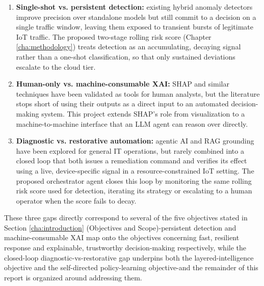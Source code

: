 \begin{enumerate}
	\item \textbf{Single-shot vs. persistent detection:} existing hybrid anomaly detectors improve precision over standalone models but still commit to a decision on a single traffic window, leaving them exposed to transient bursts of legitimate IoT traffic. The proposed two-stage rolling risk score (Chapter \ref{cha:methodology}) treats detection as an accumulating, decaying signal rather than a one-shot classification, so that only sustained deviations escalate to the cloud tier.
	\item \textbf{Human-only vs. machine-consumable XAI:} SHAP and similar techniques have been validated as tools for human analysts, but the literature stops short of using their outputs as a direct input to an automated decision-making system. This project extends SHAP's role from visualization to a machine-to-machine interface that an LLM agent can reason over directly.
	\item \textbf{Diagnostic vs. restorative automation:} agentic AI and RAG grounding have been explored for general IT operations, but rarely combined into a closed loop that both issues a remediation command and verifies its effect using a live, device-specific signal in a resource-constrained IoT setting. The proposed orchestrator agent closes this loop by monitoring the same rolling risk score used for detection, iterating its strategy or escalating to a human operator when the score fails to decay.
\end{enumerate}

These three gaps directly correspond to several of the five objectives stated in Section \ref{cha:introduction} (Objectives and Scope)-persistent detection and machine-consumable XAI map onto the objectives concerning fast, resilient response and explainable, trustworthy decision-making respectively, while the closed-loop diagnostic-vs-restorative gap underpins both the layered-intelligence objective and the self-directed policy-learning objective-and the remainder of this report is organized around addressing them.
